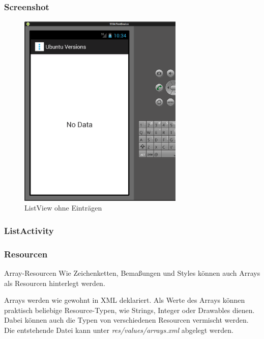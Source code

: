 \begin{frame}
   \frametitle{Screenshot}
   \begin{figure}[h!]
     \centering
     \includegraphics[width=0.7\textwidth]{pictures/hello_list_empty.ps}
     \caption{
        ListView ohne Einträgen
     }
     \label{fig:hello_list_empty}
   \end{figure}
\end{frame}

\begin{frame}
   \frametitle{ListActivity}
   
\end{frame}

\begin{frame}
   \frametitle{Resourcen}

   \begin{alertblock}{Array-Resourcen}
      Wie Zeichenketten, Bemaßungen und Styles können auch Arrays als Resourcen 
      hinterlegt werden.

      \vspace{5mm}

      Arrays werden wie gewohnt in XML deklariert. Als Werte des Arrays können 
      praktisch beliebige Resource-Typen, wie Strings, Integer oder Drawables dienen. 
      Dabei können auch die Typen von verschiedenen Resourcen vermischt werden. 
      Die entstehende Datei kann unter \emph{res/values/arrays.xml} 
      abgelegt werden.

      \vspace{5mm}

       
   \end{alertblock}
\end{frame}

